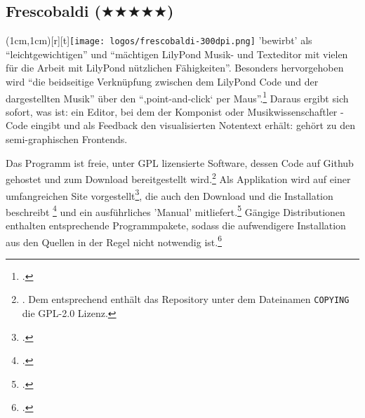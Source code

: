 %
%
%



\subsection{Frescobaldi ($\bigstar\bigstar\bigstar\bigstar\bigstar$)}

\parpic(1cm,1cm)[r][t]{\texttt{[image: logos/frescobaldi-300dpi.png]}}
\label{Frescobaldi} 'bewirbt'  als
\enquote{leichtgewichtigen} und \enquote{mächtigen LilyPond Musik- und
Texteditor mit vielen für die Arbeit mit LilyPond nützlichen Fähigkeiten}.
Besonders hervorgehoben wird \enquote{die beidseitige Verknüpfung zwischen dem
LilyPond Code und der dargestellten Musik} über den \enquote{‚point-and-click‘
per Maus}.\footcite[vgl.][\nopage wp.]{LilyPond2018g} Daraus ergibt sich sofort,
was  ist: ein Editor, bei dem der Komponist oder
Musikwissenschaftler -Code eingibt und als Feedback den
visualisierten Notentext erhält:  gehört zu den
semi-graphischen Frontends.

Das Programm ist freie, unter GPL lizensierte Software, dessen Code auf Github
ge\-hos\-tet und zum Download bereitgestellt wird.\footnote{\cite[vgl.][\nopage
wp.]{Frescobaldi2019a}. Dem entsprechend enthält das Repository unter dem
Dateinamen \texttt{COPYING} die GPL-2.0 Lizenz.} Als Applikation wird
 auf einer umfangreichen Site vorgestellt\footcite[vgl.][\nopage
wp.]{Frescobaldi2017a}, die auch den Download und die Installation beschreibt
\footcite[vgl.][\nopage wp.]{Frescobaldi2015a} und ein ausführliches 'Manual'
mitliefert.\footcite[vgl.][\nopage wp.]{Frescobaldi2012a} Gängige Distributionen
enthalten entsprechende Programmpakete, sodass die aufwendigere Installation aus
den Quellen in der Regel nicht notwendig ist.\footcite[vgl.][\nopage
wp.]{UbuntuFrescobaldi2016a}

